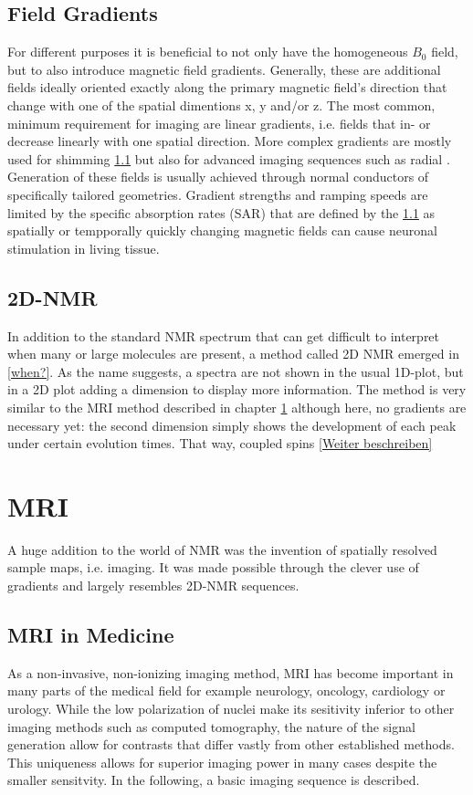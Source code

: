        \subsection{Field Gradients}
        For different purposes it is beneficial to not only have the homogeneous $B_0$ field, but to also introduce magnetic field gradients. Generally, these are additional fields ideally oriented exactly along the primary magnetic field's direction that change with one of the spatial dimentions x, y and/or z. The most common, minimum requirement for imaging are linear gradients, i.e. fields that in- or decrease linearly with one spatial direction. More complex gradients are mostly used for shimming \ref{} but also for advanced imaging sequences such as radial . Generation of these fields is usually achieved through normal conductors of specifically tailored geometries. Gradient strengths and ramping speeds are limited by the specific absorption rates (SAR) that are defined by the \ref{} as spatially or tempporally quickly changing magnetic fields can cause neuronal stimulation in living tissue.
        \subsection{2D-NMR}
        In addition to the standard NMR spectrum that can get difficult to interpret when many or large molecules are present, a method called 2D NMR emerged in \ref{when?}. As the name suggests, a spectra are not shown in the usual 1D-plot, but in a 2D plot adding a dimension to display more information. The method is very similar to the MRI method described in chapter \ref{theory:section:MRI} although here, no gradients are necessary yet: the second dimension simply shows the development of each peak under certain evolution times. That way, coupled spins \ref{Weiter beschreiben}
    \section{MRI}
    \label{theory:section:MRI}
        A huge addition to the world of NMR was the invention of spatially resolved sample maps, i.e. imaging. It was made possible through the clever use of gradients and largely resembles 2D-NMR sequences.
        \subsection{MRI in Medicine}
            As a non-invasive, non-ionizing imaging method, MRI has become important in many parts of the medical field for example neurology, oncology, cardiology or urology. While the low polarization of nuclei make its sesitivity inferior to other imaging methods such as computed tomography, the nature of the signal generation allow for contrasts that differ vastly from other established methods. This uniqueness allows for superior imaging power in many cases despite the smaller sensitvity. In the following, a basic imaging sequence is described.
